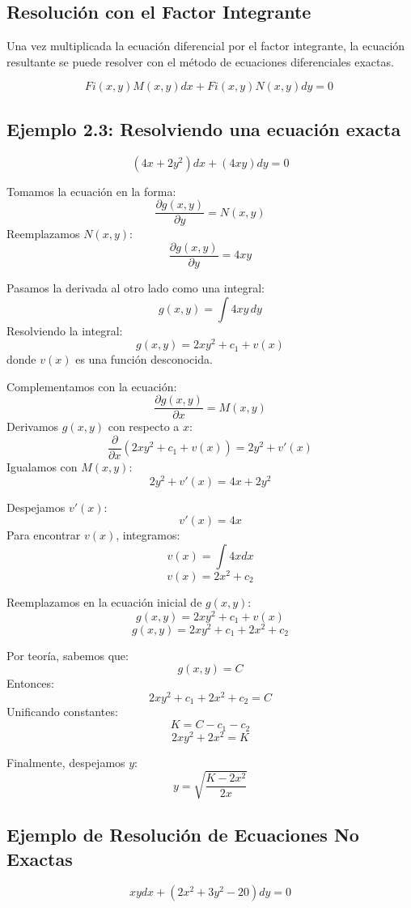 \subsection*{Resolución con el Factor Integrante}

Una vez multiplicada la ecuación diferencial por el factor integrante, la ecuación resultante se puede resolver con el método de ecuaciones diferenciales exactas.

\[
   Fi( x,y) M( x,y) dx+Fi( x,y) N( x,y) dy=0\ 
    \]

    
\subsection*{Ejemplo 2.3: Resolviendo una ecuación exacta}


\[
(4x+2y^{2})dx + (4xy)dy = 0
\]

Tomamos la ecuación en la forma:
\[
\frac{\partial g( x,y)}{\partial y} = N( x,y)
\]
Reemplazamos \( N(x,y) \):
\[
\frac{\partial g( x,y)}{\partial y} = 4xy
\]

Pasamos la derivada al otro lado como una integral:
\[
g( x,y) = \int 4xy \, dy
\]
Resolviendo la integral:
\[
g( x,y) = 2xy^{2} + c_{1} + v( x)
\]
donde \( v(x) \) es una función desconocida.

Complementamos con la ecuación:
\[
\frac{\partial g( x,y)}{\partial x} = M( x,y)
\]
Derivamos \( g(x,y) \) con respecto a \( x \):
\[
\frac{\partial}{\partial x} \left( 2xy^{2} + c_{1} + v(x) \right) = 2y^{2} + v'(x)
\]
Igualamos con \( M(x,y) \):
\[
2y^{2} + v'(x) = 4x+ 2y^{2}
\]

Despejamos \( v'(x) \):
\[
v'(x) = 4x
\]
Para encontrar \( v(x) \), integramos:
\[
v( x) = \int 4x dx
\]
\[
v( x) = 2x^{2} + c_{2}
\]

Reemplazamos en la ecuación inicial de \( g(x,y) \):
\[
g( x,y) = 2xy^{2} + c_{1} + v( x)
\]
\[
g( x,y) = 2xy^{2} + c_{1} + 2x^{2} + c_{2}
\]

Por teoría, sabemos que:
\[
g( x,y) = C
\]
Entonces:
\[
2xy^{2} + c_{1} + 2x^{2} + c_{2} = C
\]
Unificando constantes:
\[
K = C - c_{1} - c_{2}
\]
\[
2xy^{2} + 2x^{2} = K
\]

Finalmente, despejamos \( y \):
\[
y = \sqrt{\frac{K - 2x^{2}}{2x}}
\]


\subsection{Ejemplo de Resolución de Ecuaciones No Exactas}

\[
xydx + \left( 2x^{2} +3y^{2} -20\right) dy = 0
\]

